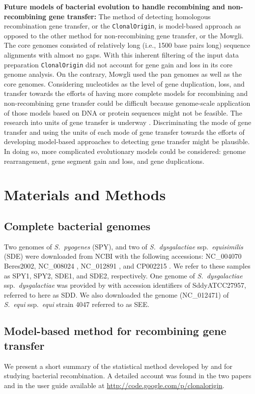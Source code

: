 \documentclass[english]{article}
\begin{document}
\textbf{Future models of bacterial evolution to handle recombining and
non-recombining gene transfer:}
The method of detecting homologous recombination gene transfer, or
the \texttt{ClonalOrigin}, is model-based approach as opposed to the other
method for non-recombining gene transfer, or the Mowgli.
The core genomes consisted of relatively long (i.e., 1500 base pairs
long) sequence alignments with almost no gaps. With this inherent
filtering of the input data preparation \texttt{ClonalOrigin} did not account
for gene gain and loss in its core genome analysis. On the contrary,
Mowgli used the pan genomes as well as the core genomes.  Considering
nucleotides as the level of gene duplication, loss, and transfer towards
the efforts of having more complete models for recombining and non-recombining
gene transfer
could be difficult because genome-scale application of those models
based on DNA or protein sequences might not be feasible.
The research into units
of gene transfer is underway \citep[e.g.,][]{Chan2009a}. Discriminating
the mode of gene transfer and using the units of each mode of gene
transfer towards the efforts of developing model-based approaches
to detecting gene transfer might be plausible. In doing so, more complicated
evolutionary models could be considered: genome rearrangement,
gene segment gain and loss, and gene duplications. 


\section{Materials and Methods}

\subsection{Complete bacterial genomes}
Two genomes of \textit{S.\ pyogenes} (SPY), and two of \textit{S.\ dysgalactiae}
ssp.\textit{\ equisimilis} (SDE) were downloaded from NCBI with the following
accessions: NC\_004070 {Beres2002}, NC\_008024 \citep{Beres2006}, NC\_012891
\citep{Shimomura2011}, and CP002215 \citep{Suzuki2011}. We refer to these
samples as SPY1, SPY2, SDE1, and SDE2, respectively. One genome of 
\textit{S.\ dysgalactiae} ssp.\textit{\ dysgalactiae} was provided by 
\citet{Suzuki2011}
with accession identifiers of SddyATCC27957, referred to here as SDD. We also
downloaded the genome (NC\_012471) of \textit{S.\ equi} ssp.\textit{\ equi}
strain 4047 referred to as SEE.

\subsection{Model-based method for recombining gene transfer}
We present a short summary of the statistical method developed by
\citet{Didelot2007} and \citet{Didelot2010} for studying bacterial
recombination. A detailed account was found in the two papers and in the user
guide available at \url{http://code.google.com/p/clonalorigin}.  
\end{document}
